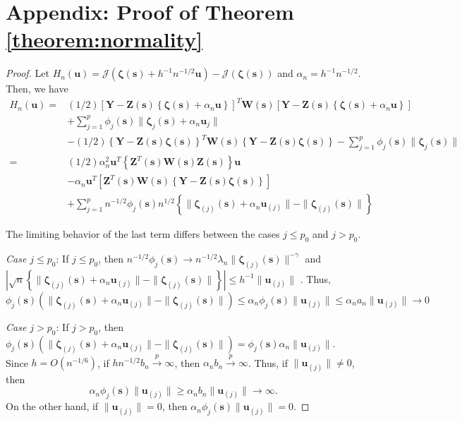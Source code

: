 \documentclass[12pt,english,authoryear, review]{article}\usepackage[]{graphicx}\usepackage[]{color}
\theoremstyle{plain}
\theoremstyle{plain}
\begin{document}
\section*{Appendix: Proof of Theorem \ref{theorem:normality}\label{sec:gaussian-normality-proof} }
\begin{proof}
Let $H_{n}(\bm{u})=\mathcal{J}\left(\bm{\zeta}\left(\bm{s}\right)+h^{-1}n^{-1/2}\bm{u}\right)-\mathcal{J}\left(\bm{\zeta}\left(\bm{s}\right)\right)$
and $\alpha_{n}=h^{-1}n^{-1/2}$. Then, we have 
\begin{align*}
H_{n}\left(\bm{u}\right)= & (1/2)\left[\bm{Y}-\bm{Z}(\bm{s})\left\{ \bm{\zeta}\left(\bm{s}\right)+\alpha_{n}\bm{u}\right\} \right]^{T}\bm{W}(\bm{s})\left[\bm{Y}-\bm{Z}(\bm{s})\left\{ \bm{\zeta}\left(\bm{s}\right)+\alpha_{n}\bm{u}\right\} \right]\\
 & +\sum_{j=1}^{p}\phi_{j}(\bm{s})\|\bm{\zeta}_{j}(\bm{s})+\alpha_{n}\bm{u}_{j}\|\\
 & -(1/2)\left\{ \bm{Y}-\bm{Z}(\bm{s})\bm{\zeta}(\bm{s})\right\} ^{T}\bm{W}(\bm{s})\left\{ \bm{Y}-\bm{Z}(\bm{s})\bm{\zeta}(\bm{s})\right\} -\sum_{j=1}^{p}\phi_{j}(\bm{s})\|\bm{\zeta}_{j}(\bm{s})\|\\
= & \left(1/2\right)\alpha_{n}^{2}\bm{u}^{T}\left\{ \bm{Z}^{T}(\bm{s})\bm{W}(\bm{s})\bm{Z}(\bm{s})\right\} \bm{u}\\
 & -\alpha_{n}\bm{u}^{T}\left[\bm{Z}^{T}(\bm{s})\bm{W}(\bm{s})\left\{ \bm{Y}-\bm{Z}(\bm{s})\bm{\zeta}(\bm{s})\right\} \right]\\
 & +\sum_{j=1}^{p}n^{-1/2}\phi_{j}(\bm{s})n^{1/2}\left\{ \|\bm{\zeta}_{\left(j\right)}(\bm{s})+\alpha_{n}\bm{u}_{\left(j\right)}\|-\|\bm{\zeta}_{\left(j\right)}(\bm{s})\|\right\} 
\end{align*}


The limiting behavior of the last term differs between the cases $j\le p_{0}$
and $j>p_{0}$.

\emph{Case $j\le p_{0}$}: If $j\le p_{0}$, then $n^{-1/2}\phi_{j}(\bm{s})\to n^{-1/2}\lambda_{n}\|\bm{\zeta}_{\left(j\right)}(\bm{s})\|^{-\gamma}$
and $|\sqrt{n}\left\{ \|\bm{\zeta}_{\left(j\right)}(\bm{s})+\alpha_{n}\bm{u}_{\left(j\right)}\|-\|\bm{\zeta}_{\left(j\right)}(\bm{s})\|\right\} |\le h^{-1}\|\bm{u}_{\left(j\right)}\|$
. Thus, 
\[
\phi_{j}(\bm{s})\left(\|\bm{\zeta}_{\left(j\right)}(\bm{s})+\alpha_{n}\bm{u}_{\left(j\right)}\|-\|\bm{\zeta}_{\left(j\right)}(\bm{s})\|\right)\le\alpha_{n}\phi_{j}(\bm{s})\|\bm{u}_{\left(j\right)}\|\le\alpha_{n}a_{n}\|\bm{u}_{\left(j\right)}\|\to0
\]


\emph{Case $j>p_{0}$}: If $j>p_{0}$, then $\phi_{j}(\bm{s})\left(\|\bm{\zeta}_{\left(j\right)}(\bm{s})+\alpha_{n}\bm{u}_{\left(j\right)}\|-\|\bm{\zeta}_{\left(j\right)}(\bm{s})\|\right)=\phi_{j}(\bm{s})\alpha_{n}\|\bm{u}_{\left(j\right)}\|$.
Since $h=O(n^{-1/6})$, if $hn^{-1/2}b_{n}\xrightarrow{p}\infty$,
then $\alpha_{n}b_{n}\xrightarrow{p}\infty$. Thus, if $\|\bm{u}_{\left(j\right)}\|\ne0$,
then 
\[
\alpha_{n}\phi_{j}(\bm{s})\|\bm{u}_{\left(j\right)}\|\ge\alpha_{n}b_{n}\|\bm{u}_{\left(j\right)}\|\to\infty.
\]
On the other hand, if $\|\bm{u}_{\left(j\right)}\|=0$, then $\alpha_{n}\phi_{j}(\bm{s})\|\bm{u}_{\left(j\right)}\|=0$.


\end{proof}
\end{document}
